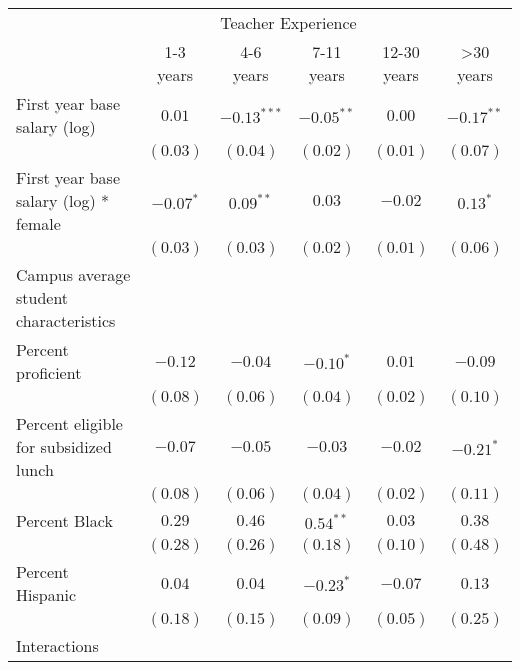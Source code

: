 \documentclass[12pt,]{article}
\begin{document}
\begin{sidewaystable}
\begin{center}
\begin{tabular}{l c c c c c }
\hline
 & \multicolumn{4}{c}{Teacher Experience} \\ \cline{2-6}
 & 1-3 years & 4-6 years & 7-11 years & 12-30 years & >30 years \\
\hline
First year base salary (log)                & $0.01$       & $-0.13^{***}$ & $-0.05^{**}$ & $0.00$       & $-0.17^{**}$ \\
                                            & $(0.03)$     & $(0.04)$      & $(0.02)$     & $(0.01)$     & $(0.07)$     \\
First year base salary (log) * female       & $-0.07^{*}$  & $0.09^{**}$   & $0.03$       & $-0.02$      & $0.13^{*}$   \\
                                            & $(0.03)$     & $(0.03)$      & $(0.02)$     & $(0.01)$     & $(0.06)$     \\
Campus average student characteristics      &              &               &              &              &              \\
\quad Percent proficient                    & $-0.12$      & $-0.04$       & $-0.10^{*}$  & $0.01$       & $-0.09$      \\
                                            & $(0.08)$     & $(0.06)$      & $(0.04)$     & $(0.02)$     & $(0.10)$     \\
\quad Percent eligible for subsidized lunch & $-0.07$      & $-0.05$       & $-0.03$      & $-0.02$      & $-0.21^{*}$  \\
                                            & $(0.08)$     & $(0.06)$      & $(0.04)$     & $(0.02)$     & $(0.11)$     \\
\quad Percent Black                         & $0.29$       & $0.46$        & $0.54^{**}$  & $0.03$       & $0.38$       \\
                                            & $(0.28)$     & $(0.26)$      & $(0.18)$     & $(0.10)$     & $(0.48)$     \\
\quad Percent Hispanic                      & $0.04$       & $0.04$        & $-0.23^{*}$  & $-0.07$      & $0.13$       \\
                                            & $(0.18)$     & $(0.15)$      & $(0.09)$     & $(0.05)$     & $(0.25)$     \\
Interactions                                &              &               &              &              &              \\

\end{tabular}
\end{center}
\end{sidewaystable}
\end{document}
